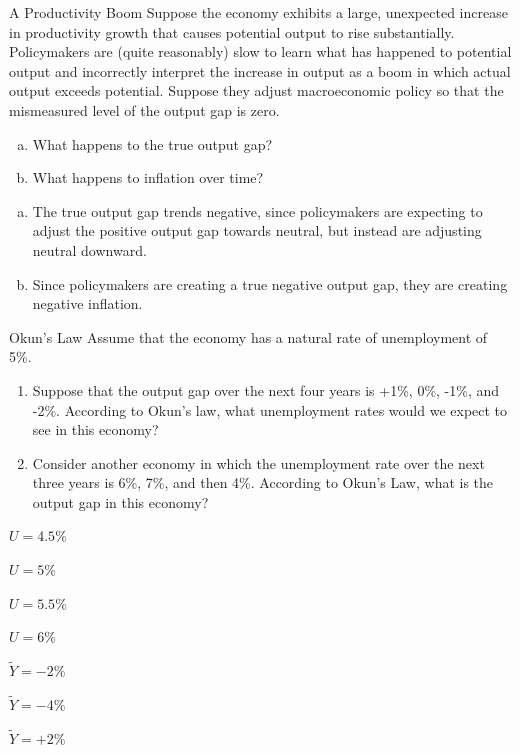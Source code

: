 \documentclass[8pt]{extarticle}
\begin{document}
  \begin{problem}{A Productivity Boom}
    Suppose the economy exhibits a large, unexpected increase in productivity growth that causes potential output to rise substantially. Policymakers are (quite reasonably) slow to learn what has happened to potential output and incorrectly interpret the increase in output as a boom in which actual output exceeds potential. Suppose they adjust macroeconomic policy so that the mismeasured level of the output gap is zero.
    \begin{enumerate}[(a)]
      \item What happens to the true output gap?
      \item What happens to inflation over time?
    \end{enumerate}
    \tcblower
    \begin{enumerate}[(a)]
      \item The true output gap trends negative, since policymakers are expecting to adjust the positive output gap towards neutral, but instead are adjusting neutral downward.
      \item Since policymakers are creating a true negative output gap, they are creating negative inflation.
    \end{enumerate}
  \end{problem}
  \begin{problem}{Okun's Law}
    Assume that the economy has a natural rate of unemployment of 5\%.
    \begin{enumerate}
      \item Suppose that the output gap over the next four years is +1\%, 0\%, -1\%, and -2\%. According to Okun’s law, what unemployment rates would we expect to see in this economy?
      \item Consider another economy in which the unemployment rate over the next three years is 6\%, 7\%, and then 4\%. According to Okun’s Law, what is the output gap in this economy?
    \end{enumerate}
    \tcblower
    \begin{tcolorbox}[colback = white, title = (a), breakable]
      \begin{description}[font = \normalfont]
        \item[$\tilde{Y} = +1\%$:] $U = 4.5\%$
        \item[$\tilde{Y} = 0\%$:] $U = 5\%$
        \item[$\tilde{Y} = -1\%$:] $U = 5.5\%$
        \item[$\tilde{Y} = -2\%$:] $U = 6\%$
      \end{description}
    \end{tcolorbox}
    \begin{tcolorbox}[colback = white, title = (b), breakable]
      \begin{description}[font=\normalfont]
        \item[$U = 6\%$:] $\tilde{Y} = -2\%$
        \item[$U = 7\%$:] $\tilde{Y} = -4\%$
        \item[$U = 4\%$:] $\tilde{Y} = +2\%$
      \end{description}
    \end{tcolorbox}
  \end{problem}
\end{document}

